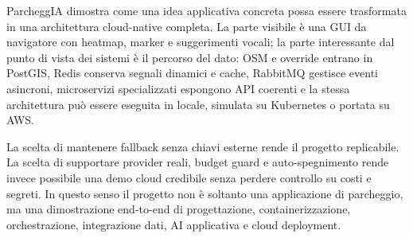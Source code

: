 \documentclass[11pt,a4paper]{article}
\begin{document}
ParcheggIA dimostra come una idea applicativa concreta possa essere trasformata in una architettura cloud-native completa. La parte visibile \`e una GUI da navigatore con heatmap, marker e suggerimenti vocali; la parte interessante dal punto di vista dei sistemi \`e il percorso del dato: OSM e override entrano in PostGIS, Redis conserva segnali dinamici e cache, RabbitMQ gestisce eventi asincroni, microservizi specializzati espongono API coerenti e la stessa architettura pu\`o essere eseguita in locale, simulata su Kubernetes o portata su AWS.

La scelta di mantenere fallback senza chiavi esterne rende il progetto replicabile. La scelta di supportare provider reali, budget guard e auto-spegnimento rende invece possibile una demo cloud credibile senza perdere controllo su costi e segreti. In questo senso il progetto non \`e soltanto una applicazione di parcheggio, ma una dimostrazione end-to-end di progettazione, containerizzazione, orchestrazione, integrazione dati, AI applicativa e cloud deployment.
\end{document}
